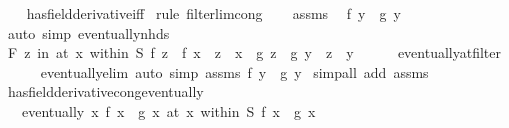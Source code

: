 \begin{isabellebody}
%
\isadelimproof
\ \ %
\endisadelimproof
%
\isatagproof
{}\isamarkupfalse%
\ has{\isacharunderscore}{\kern0pt}field{\isacharunderscore}{\kern0pt}derivative{\isacharunderscore}{\kern0pt}iff\isanewline
{}\isamarkupfalse%
\ {\isacharparenleft}{\kern0pt}rule\ filterlim{\isacharunderscore}{\kern0pt}cong{\isacharparenright}{\kern0pt}\isanewline
\ \ \isamarkupfalse%
\ assms\ \isamarkupfalse%
\ {\isachardoublequoteopen}f\ y\ {\isacharequal}{\kern0pt}\ g\ y{\isachardoublequoteclose}\isanewline
\ \ \ \ \isamarkupfalse%
\ {\isacharparenleft}{\kern0pt}auto\ simp{\isacharcolon}{\kern0pt}\ eventually{\isacharunderscore}{\kern0pt}nhds{\isacharparenright}{\kern0pt}\isanewline
\ \ \isamarkupfalse%
\ {\isacharasterisk}{\kern0pt}\ \isamarkupfalse%
\ {\isachardoublequoteopen}{\isasymforall}\isactrlsub F\ z\ in\ at\ x\ within\ S{\isachardot}{\kern0pt}\ {\isacharparenleft}{\kern0pt}f\ z\ {\isacharminus}{\kern0pt}\ f\ x{\isacharparenright}{\kern0pt}\ {\isacharslash}{\kern0pt}\ {\isacharparenleft}{\kern0pt}z\ {\isacharminus}{\kern0pt}\ x{\isacharparenright}{\kern0pt}\ {\isacharequal}{\kern0pt}\ {\isacharparenleft}{\kern0pt}g\ z\ {\isacharminus}{\kern0pt}\ g\ y{\isacharparenright}{\kern0pt}\ {\isacharslash}{\kern0pt}\ {\isacharparenleft}{\kern0pt}z\ {\isacharminus}{\kern0pt}\ y{\isacharparenright}{\kern0pt}{\isachardoublequoteclose}\isanewline
\ \ \ \ \isamarkupfalse%
\ eventually{\isacharunderscore}{\kern0pt}at{\isacharunderscore}{\kern0pt}filter\isanewline
\ \ \ \ \isamarkupfalse%
\ eventually{\isacharunderscore}{\kern0pt}elim\ {\isacharparenleft}{\kern0pt}auto\ simp{\isacharcolon}{\kern0pt}\ assms\ {\isacartoucheopen}f\ y\ {\isacharequal}{\kern0pt}\ g\ y{\isacartoucheclose}{\isacharparenright}{\kern0pt}\isanewline
{}\isamarkupfalse%
\ {\isacharparenleft}{\kern0pt}simp{\isacharunderscore}{\kern0pt}all\ add{\isacharcolon}{\kern0pt}\ assms{\isacharparenright}{\kern0pt}%
\endisatagproof
{\isafoldproof}%
%
\isadelimproof
\isanewline
%
\endisadelimproof
\isanewline
{}\isamarkupfalse%
\ has{\isacharunderscore}{\kern0pt}field{\isacharunderscore}{\kern0pt}derivative{\isacharunderscore}{\kern0pt}cong{\isacharunderscore}{\kern0pt}eventually{\isacharcolon}{\kern0pt}\isanewline
\ \ \ {\isachardoublequoteopen}eventually\ {\isacharparenleft}{\kern0pt}{\isasymlambda}x{\isachardot}{\kern0pt}\ f\ x\ {\isacharequal}{\kern0pt}\ g\ x{\isacharparenright}{\kern0pt}\ {\isacharparenleft}{\kern0pt}at\ x\ within\ S{\isacharparenright}{\kern0pt}{\isachardoublequoteclose}\ {\isachardoublequoteopen}f\ x\ {\isacharequal}{\kern0pt}\ g\ x{\isachardoublequoteclose}\isanewline

\end{isabellebody}
